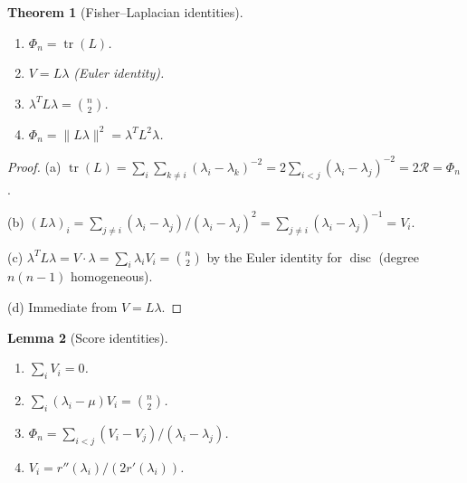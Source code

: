 \documentclass[10pt,a4paper]{amsart}
\theoremstyle{plain}
\newtheorem{theorem}{Theorem}[section]
\newtheorem{lemma}[theorem]{Lemma}
\theoremstyle{definition}
\theoremstyle{remark}
\DeclareMathOperator{\tr}{tr}
\DeclareMathOperator{\disc}{disc}
\begin{document}
\begin{theorem}[Fisher--Laplacian identities]
\label{thm:fisher-lap}
\begin{enumerate}[label=\textup{(\alph*)},nosep]
  \item $\Phi_n=\tr(L)$.
  \item $V=L\lambda$ \textup{(Euler identity)}.
  \item $\lambda^T L\lambda=\binom{n}{2}$.
  \item $\Phi_n=\|L\lambda\|^2=\lambda^T L^2\lambda$.
\end{enumerate}
\end{theorem}

\begin{proof}
(a) $\tr(L)=\sum_i\sum_{k\ne i}(\lambda_i-\lambda_k)^{-2}=2\sum_{i<j}(\lambda_i-\lambda_j)^{-2}=2\mathcal{R}=\Phi_n$.

(b) $(L\lambda)_i=\sum_{j\ne i}(\lambda_i-\lambda_j)/(\lambda_i-\lambda_j)^2=\sum_{j\ne i}(\lambda_i-\lambda_j)^{-1}=V_i$.

(c) $\lambda^T L\lambda=V\cdot\lambda=\sum_i\lambda_i V_i=\binom{n}{2}$ by the Euler identity for $\disc$ (degree $n(n-1)$ homogeneous).

(d) Immediate from $V=L\lambda$.
\end{proof}

\begin{lemma}[Score identities]\label{lem:score-ids}
\begin{enumerate}[label=\textup{(\roman*)},nosep]
  \item $\sum_i V_i=0$.
  \item $\sum_i(\lambda_i-\mu)V_i=\binom{n}{2}$.
  \item $\Phi_n=\sum_{i<j}(V_i-V_j)/(\lambda_i-\lambda_j)$.
  \item $V_i=r''(\lambda_i)/(2r'(\lambda_i))$.
\end{enumerate}
\end{lemma}
\end{document}
